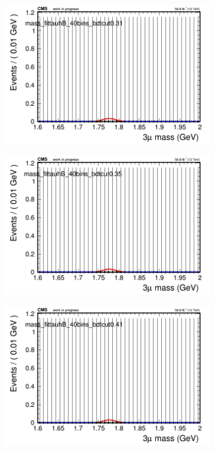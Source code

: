 \begin{figure}[H]
\begin{subfigure}{0.2\textwidth}
        \caption{}
    \end{subfigure}
    \begin{subfigure}{0.2\textwidth}
        \includegraphics[width=\textwidth]{flat_fit/plots/tauhB/massfit_tauhB_40bins_bdtcut0.31.png}
        \caption{}
    \end{subfigure}
    \begin{subfigure}{0.2\textwidth}
        \includegraphics[width=\textwidth]{flat_fit/plots/tauhB/massfit_tauhB_40bins_bdtcut0.35.png}
        \caption{}
    \end{subfigure}
    \begin{subfigure}{0.2\textwidth}
        \includegraphics[width=\textwidth]{flat_fit/plots/tauhB/massfit_tauhB_40bins_bdtcut0.41.png}

\end{subfigure}
\end{figure}
